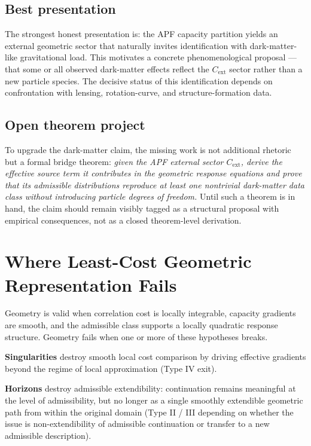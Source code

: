 \documentclass[11pt]{article}
\begin{document}
\subsection*{Best presentation}
The strongest honest presentation is: the APF capacity partition yields an
external geometric sector that naturally invites identification with
dark-matter-like gravitational load. This motivates a concrete phenomenological
proposal --- that some or all observed dark-matter effects reflect the
$C_{\mathrm{ext}}$ sector rather than a new particle species. The decisive
status of this identification depends on confrontation with lensing,
rotation-curve, and structure-formation data.

\subsection*{Open theorem project}
To upgrade the dark-matter claim, the missing work is not additional rhetoric
but a formal bridge theorem: \emph{given the APF external sector
$C_{\mathrm{ext}}$, derive the effective source term it contributes in the
geometric response equations and prove that its admissible distributions
reproduce at least one nontrivial dark-matter data class without introducing
particle degrees of freedom.} Until such a theorem is in hand, the claim should
remain visibly tagged as a structural proposal with empirical consequences,
not as a closed theorem-level derivation.

\section{Where Least-Cost Geometric Representation Fails}\label{sec:geo-fails}

Geometry is valid when correlation cost is locally integrable, capacity
gradients are smooth, and the admissible class supports a locally quadratic
response structure. Geometry fails when one or more of these hypotheses breaks.

\textbf{Singularities} destroy smooth local cost comparison by driving effective
gradients beyond the regime of local approximation (Type IV exit).

\textbf{Horizons} destroy admissible extendibility: continuation remains
meaningful at the level of admissibility, but no longer as a single smoothly
extendible geometric path from within the original domain (Type II / III
depending on whether the issue is non-extendibility of admissible continuation
or transfer to a new admissible description).
\end{document}
